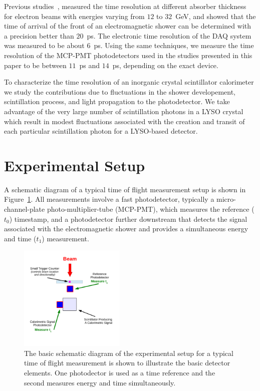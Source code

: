 \documentclass[12pt]{article}
\begin{document}
Previous studies~\cite{MCPFastCaloNIMA}, measured the time resolution at different
absorber thickness for electron beams with energies varying from $12$ to
$32$~GeV, and showed that the time of arrival of the front of an electromagnetic
shower can be determined with a precision better than $20$~ps. The electronic
time resolution of the DAQ system was measured to be about $6$~ps. Using
the same techniques, we measure the time resolution of the MCP-PMT photodetectors used in the studies presented in this paper  to be between $11$~ps and $14$~ps, depending on the exact device.

To characterize the time resolution of an inorganic crystal scintillator  calorimeter  we
study the contributions due to fluctuations in the shower developement, scintillation process, and light propagation  to the photodetector.  We take advantage of the very large number of scintillation photons in a LYSO crystal which result in modest fluctuations associated with the creation and transit of each particular scintillation photon for a LYSO-based detector. 

 

\section{Experimental Setup}

A schematic diagram of a typical time of flight measurement setup
is shown in Figure~\ref{fig:TypicalSchematicDiagram}. All
measurements involve a fast photodetector,  typically a micro-channel-plate photo-multiplier-tube 
(MCP-PMT), which  measures the reference ($t_{0}$) timestamp, and a photodetector further downstream that detects the signal associated with the electromagnetic shower  and provides  a simultaneous energy  and time ($t_{1}$) measurement. 

\begin{figure}[H] \centering
\includegraphics[width=0.45\textwidth]{figs/TypicalSchematicDiagram} 
\caption{\small The basic schematic diagram of the experimental setup for
a typical time of flight measurement is shown to illustrate the
basic detector elements. One photodector is used as a  time reference  and the second measures energy and time simultaneously.} 
\label{fig:TypicalSchematicDiagram}
\end{figure}
\end{document}
